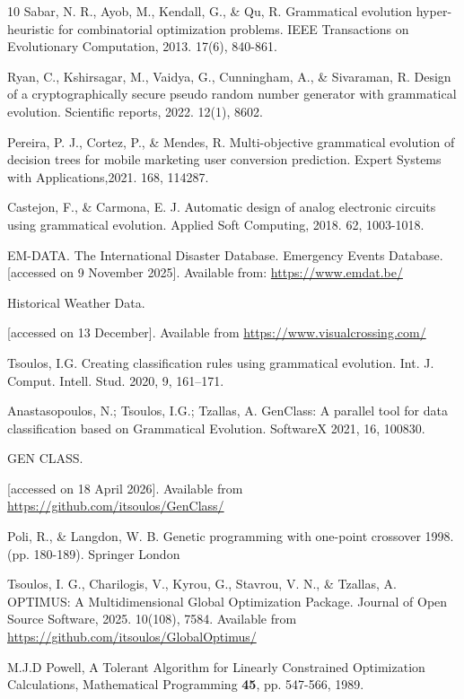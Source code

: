 \documentclass[12pt]{Definitions/academia}
\begin{document}
\begin{thebibliography}{10}
Sabar, N. R., Ayob, M., Kendall, G., \& Qu, R.
Grammatical evolution hyper-heuristic for combinatorial optimization
problems. IEEE Transactions on Evolutionary Computation, 2013. 17(6),
840-861.

Ryan, C., Kshirsagar, M., Vaidya, G., Cunningham,
A., \& Sivaraman, R. Design of a cryptographically secure pseudo random
number generator with grammatical evolution. Scientific reports, 2022.
12(1), 8602.

Pereira, P. J., Cortez, P., \& Mendes, R. Multi-objective
grammatical evolution of decision trees for mobile marketing user
conversion prediction. Expert Systems with Applications,2021. 168,
114287.

Castejon, F., \& Carmona, E. J. Automatic
design of analog electronic circuits using grammatical evolution.
Applied Soft Computing, 2018. 62, 1003-1018.


EM-DATA. The International Disaster Database. Emergency
Events Database. {[}accessed on 9 November 2025{]}. Available from:
\url{https://www.emdat.be/}

 Historical Weather Data. {[accessed on 13 December{]}. 
	Available from \url{https://www.visualcrossing.com/}

 Tsoulos, I.G. Creating classification rules
using grammatical evolution. Int. J. Comput. Intell. Stud. 2020, 9,
161--171.

Anastasopoulos, N.; Tsoulos, I.G.; Tzallas,
A. GenClass: A parallel tool for data classification based on Grammatical
Evolution. SoftwareX 2021, 16, 100830.

GEN CLASS. {[accessed on 18 April 2026{]}.
	Available from \url{https://github.com/itsoulos/GenClass/}

Poli, R., \& Langdon, W. B. Genetic programming
with one-point crossover 1998. (pp. 180-189). Springer London

Tsoulos, I. G., Charilogis, V., Kyrou, G.,
Stavrou, V. N., \& Tzallas, A. OPTIMUS: A Multidimensional Global
Optimization Package. Journal of Open Source Software, 2025. 10(108),
7584. Available from \url{https://github.com/itsoulos/GlobalOptimus/}

M.J.D Powell, A Tolerant Algorithm for
Linearly Constrained Optimization Calculations, Mathematical Programming
\textbf{45}, pp. 547-566, 1989.

}}
\end{thebibliography}
\end{document}
